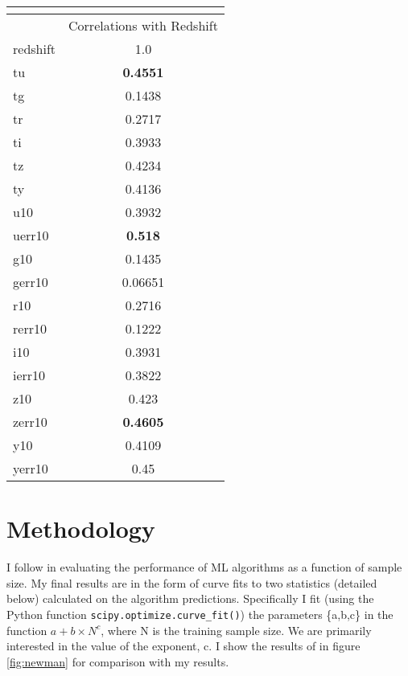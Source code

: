 \documentclass[13pt]{amsart}
\newcommand{\equin}[1]{\(#1\)}
\begin{document}
    \begin{center}
    \begin{tabular}{|l|c|}
      \multicolumn{2}{c}{} \\ \hline
       & Correlations with Redshift \\ \hline
      redshift & 1.0 \\ \hline
      tu & \textbf{0.4551} \\ \hline
      tg & 0.1438 \\ \hline
      tr & 0.2717 \\ \hline
      ti & 0.3933 \\ \hline
      tz & 0.4234 \\ \hline
      ty & 0.4136 \\ \hline
      u10 & 0.3932 \\ \hline
      uerr10 & \textbf{0.518} \\ \hline
      g10 & 0.1435 \\ \hline
      gerr10 & 0.06651 \\ \hline
      r10 & 0.2716 \\ \hline
      rerr10 & 0.1222 \\ \hline
      i10 & 0.3931 \\ \hline
      ierr10 & 0.3822 \\ \hline
      z10 & 0.423 \\ \hline
      zerr10 & \textbf{0.4605} \\ \hline
      y10 & 0.4109 \\ \hline
      yerr10 & 0.45 \\ \hline
    \end{tabular}
    \end{center}


\section{Methodology}

  I follow \cite{newman} in evaluating the performance of ML algorithms as a function of sample size. My final results are in the form of curve fits to two statistics (detailed below) calculated on the algorithm predictions. Specifically I fit (using the Python function \texttt{scipy.optimize.curve\_fit()}) the parameters \{a,b,c\} in the function
  \equin{a+b \times N^c},
  where N is the training sample size. We are primarily interested in the value of the exponent, c. I show the results of \cite{newman} in figure \ref{fig:newman} for comparison with my results.
\end{document}
